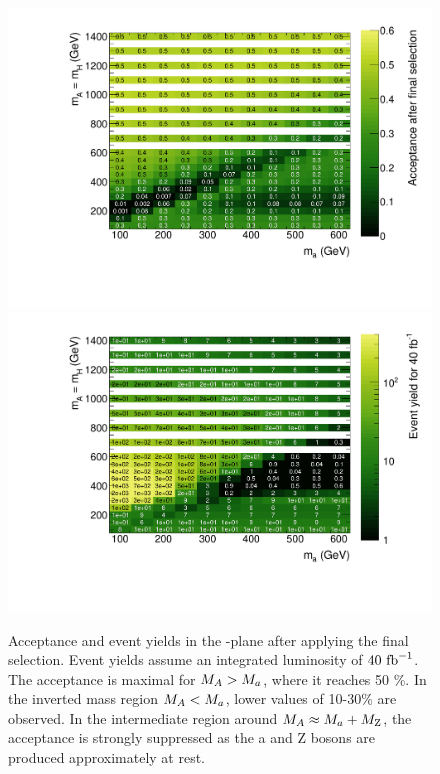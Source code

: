 \begin{figure}
\includegraphics[width=\textwidth]{texinputs/04_grid/figures/monoz/leptonic/acceptance.pdf}
\includegraphics[width=\textwidth]{texinputs/04_grid/figures/monoz/leptonic/xs_2d_dmwg-final_26300_yield40fb.pdf}
\caption{Acceptance and event yields in the  \ma-\mA plane after applying the final selection. Event yields assume an integrated luminosity of $40~\rm{fb}^{-1}$. The acceptance is maximal for $M_{A} > M_{a}$, where it reaches 50 \%. In the inverted mass region $M_{A} < M_{a}$, lower values of 10-30\% are observed. In the intermediate region around $M_{A} \approx M_{a} + M_{\rm{Z}}$, the acceptance is strongly suppressed as the a and Z bosons are produced approximately at rest.}
\label{fig:monoz_ll_acceptance}
\end{figure}

